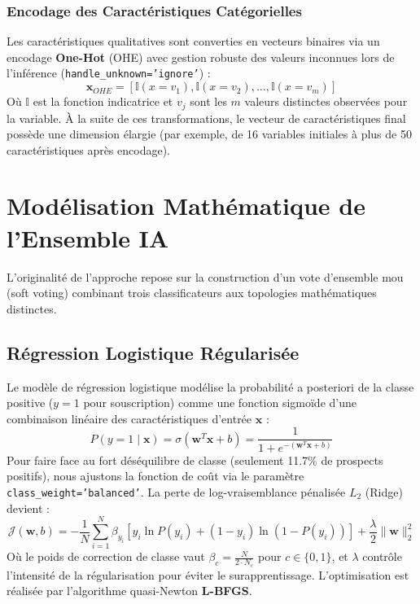 \documentclass[12pt,a4paper]{article}
\begin{document}
\subsubsection{Encodage des Caractéristiques Catégorielles}
Les caractéristiques qualitatives sont converties en vecteurs binaires via un encodage \textbf{One-Hot} (OHE) avec gestion robuste des valeurs inconnues lors de l'inférence (\texttt{handle\_unknown='ignore'}) :
\begin{equation}
    \mathbf{x}_{OHE} = \left[ \mathbb{I}(x = v_1), \mathbb{I}(x = v_2), \dots, \mathbb{I}(x = v_m) \right]
\end{equation}
Où $\mathbb{I}$ est la fonction indicatrice et $v_j$ sont les $m$ valeurs distinctes observées pour la variable. À la suite de ces transformations, le vecteur de caractéristiques final possède une dimension élargie (par exemple, de 16 variables initiales à plus de 50 caractéristiques après encodage).

\section{Modélisation Mathématique de l'Ensemble IA}
L'originalité de l'approche repose sur la construction d'un vote d'ensemble mou (soft voting) combinant trois classificateurs aux topologies mathématiques distinctes.

\subsection{Régression Logistique Régularisée}
Le modèle de régression logistique modélise la probabilité a posteriori de la classe positive ($y=1$ pour souscription) comme une fonction sigmoïde d'une combinaison linéaire des caractéristiques d'entrée $\mathbf{x}$ :
\begin{equation}
    P(y=1 \mid \mathbf{x}) = \sigma(\mathbf{w}^T \mathbf{x} + b) = \frac{1}{1 + e^{-(\mathbf{w}^T \mathbf{x} + b)}}
\end{equation}
Pour faire face au fort déséquilibre de classe (seulement 11.7\% de prospects positifs), nous ajustons la fonction de coût via le paramètre \texttt{class\_weight='balanced'}. La perte de log-vraisemblance pénalisée $L_2$ (Ridge) devient :
\begin{equation}
    \mathcal{J}(\mathbf{w}, b) = -\frac{1}{N} \sum_{i=1}^{N} \beta_{y_i} \left[ y_i \ln P(y_i) + (1-y_i) \ln (1-P(y_i)) \right] + \frac{\lambda}{2} \|\mathbf{w}\|_2^2
\end{equation}
Où le poids de correction de classe vaut $\beta_{c} = \frac{N}{2 \cdot N_c}$ pour $c \in \{0, 1\}$, et $\lambda$ contrôle l'intensité de la régularisation pour éviter le surapprentissage. L'optimisation est réalisée par l'algorithme quasi-Newton \textbf{L-BFGS}.
\end{document}
